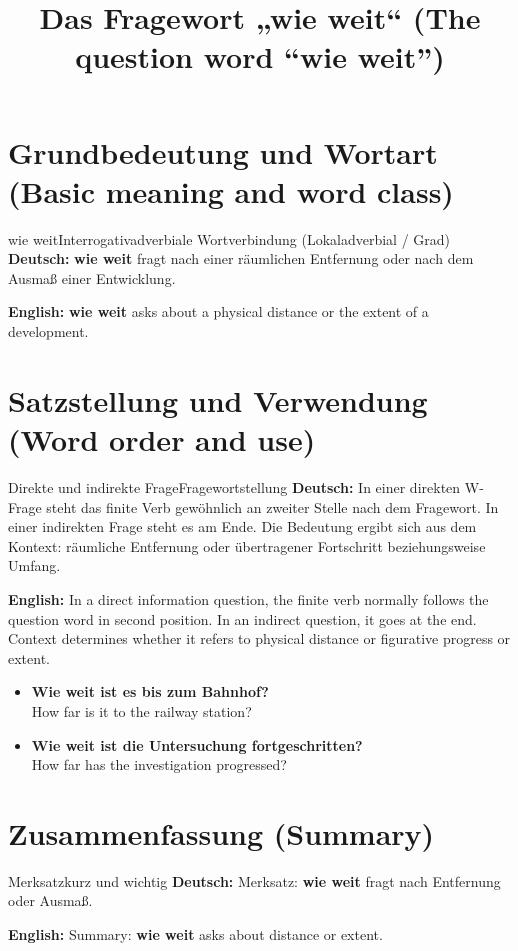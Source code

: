 \documentclass[a4paper,11pt]{article}
\title{Das Fragewort „wie weit“ (The question word “wie weit”)}
\date{}
\newcommand{\GermanText}[1]{\textbf{Deutsch: }#1\par}
\newcommand{\EnglishText}[1]{{\small\color{SoftGray}\textbf{English: }#1\par}}
\newcommand{\ExampleItem}[2]{\item \textbf{#1}\\{\small\color{SoftGray}#2}}
\begin{document}
\maketitle
\tableofcontents
\newpage
\section{Grundbedeutung und Wortart (Basic meaning and word class)}
\begin{grammarentry}{wie weit}{Interrogativadverbiale Wortverbindung (Lokaladverbial / Grad)}
\GermanText{\textbf{wie weit} fragt nach einer räumlichen Entfernung oder nach dem Ausmaß einer Entwicklung.}
\EnglishText{\textbf{wie weit} asks about a physical distance or the extent of a development.}

\end{grammarentry}
\section{Satzstellung und Verwendung (Word order and use)}
\begin{grammarentry}{Direkte und indirekte Frage}{Fragewortstellung}
\GermanText{In einer direkten W-Frage steht das finite Verb gewöhnlich an zweiter Stelle nach dem Fragewort. In einer indirekten Frage steht es am Ende. Die Bedeutung ergibt sich aus dem Kontext: räumliche Entfernung oder übertragener Fortschritt beziehungsweise Umfang.}
\EnglishText{In a direct information question, the finite verb normally follows the question word in second position. In an indirect question, it goes at the end. Context determines whether it refers to physical distance or figurative progress or extent.}
\end{grammarentry}
\begin{exbox}\begin{itemize}
\ExampleItem{Wie weit ist es bis zum Bahnhof?}{How far is it to the railway station?}
\ExampleItem{Wie weit ist die Untersuchung fortgeschritten?}{How far has the investigation progressed?}
\end{itemize}\end{exbox}
\section{Zusammenfassung (Summary)}
\begin{grammarentry}{Merksatz}{kurz und wichtig}
\GermanText{Merksatz: \textbf{wie weit} fragt nach Entfernung oder Ausmaß.}
\EnglishText{Summary: \textbf{wie weit} asks about distance or extent.}
\end{grammarentry}
\end{document}
